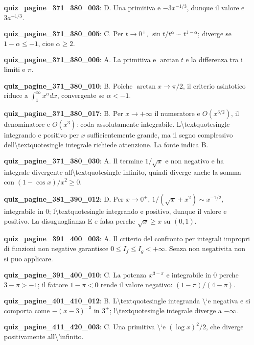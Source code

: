 \documentclass[11pt,a4paper]{article}
\newcounter{quiz}
\begin{document}
\noindent\textbf{quiz\_pagine\_371\_380\_003}: D. Una primitiva e $-3x^{-1/3}$, dunque il valore e $3a^{-1/3}$.\par\medskip
\noindent\textbf{quiz\_pagine\_371\_380\_005}: C. Per $t\to0^+$, $\sin t/t^\alpha\sim t^{1-\alpha}$; diverge se $1-\alpha\leq-1$, cioe $\alpha\geq2$.\par\medskip
\noindent\textbf{quiz\_pagine\_371\_380\_006}: A. La primitiva e $\arctan t$ e la differenza tra i limiti e $\pi$.\par\medskip
\noindent\textbf{quiz\_pagine\_371\_380\_010}: B. Poiche $\arctan x\to\pi/2$, il criterio asintotico riduce a $\int_1^\infty x^\alpha dx$, convergente se $\alpha<-1$.\par\medskip
\noindent\textbf{quiz\_pagine\_371\_380\_017}: B. Per $x\to+\infty$ il numeratore e $O(x^{3/2})$, il denominatore e $O(x^3)$: coda assolutamente integrabile. L\textbackslash{}textquotesingle integrando e positivo per $x$ sufficientemente grande, ma il segno complessivo dell\textbackslash{}textquotesingle integrale richiede attenzione. La fonte indica B.\par\medskip
\noindent\textbf{quiz\_pagine\_371\_380\_030}: A. Il termine $1/\sqrt x$ e non negativo e ha integrale divergente all\textbackslash{}textquotesingle infinito, quindi diverge anche la somma con $(1-\cos x)/x^2\geq0$.\par\medskip
\noindent\textbf{quiz\_pagine\_381\_390\_012}: D. Per $x\to0^+$, $1/(\sqrt{x}+x^2)\sim x^{-1/2}$, integrabile in $0$; l\textbackslash{}textquotesingle integrando e positivo, dunque il valore e positivo. La disuguaglianza E e falsa perche $\sqrt{x}\geq x$ su $(0,1)$.\par\medskip
\noindent\textbf{quiz\_pagine\_391\_400\_003}: A. Il criterio del confronto per integrali impropri di funzioni non negative garantisce $0\leq I_f\leq I_g<+\infty$. Senza non negativita non si puo applicare.\par\medskip
\noindent\textbf{quiz\_pagine\_391\_400\_010}: C. La potenza $x^{3-\pi}$ e integrabile in $0$ perche $3-\pi>-1$; il fattore $1-\pi<0$ rende il valore negativo: $(1-\pi)/(4-\pi)$.\par\medskip
\noindent\textbf{quiz\_pagine\_401\_410\_012}: B. L\textbackslash{}textquotesingle integranda \textbackslash{}`e negativa e si comporta come $-(x-3)^{-3}$ in $3^+$; l\textbackslash{}textquotesingle integrale diverge a $-\infty$.\par\medskip
\noindent\textbf{quiz\_pagine\_411\_420\_003}: C. Una primitiva \textbackslash{}`e $(\log x)^2/2$, che diverge positivamente all\textbackslash{}'infinito.\par\medskip
\end{document}
